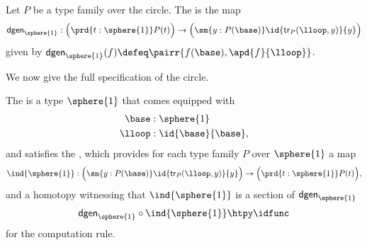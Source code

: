 \begin{defn}
Let $P$ be a type family over the circle. The  is the map
\begin{equation}\label{eq:dgen_circle}
\mathsf{dgen}_{\sphere{1}}:\Big(\prd{t:\sphere{1}}P(t)\Big)\to\Big(\sm{y:P(\base)}\id{\mathsf{tr}_P(\lloop,y)}{y}\Big)
\end{equation}
given by $\mathsf{dgen}_{\sphere{1}}(f)\defeq\pairr{f(\base),\apd{f}{\lloop}}$.
\end{defn}

We now give the full specification of the circle.

\begin{defn}
The  is a type $\sphere{1}$ that comes equipped with
\begin{align*}
\base & : \sphere{1} \\
\lloop & : \id{\base}{\base},
\end{align*}
and satisfies the , which provides for each type family $P$ over $\sphere{1}$ a map
\begin{equation*}
\ind{\sphere{1}}:\Big(\sm{y:P(\base)}\id{\mathsf{tr}_P(\lloop,y)}{y}\Big)\to \Big(\prd{t:\sphere{1}}P(t)\Big),
\end{equation*}
and a homotopy witnessing that $\ind{\sphere{1}}$ is a section of $\mathsf{dgen}_{\sphere{1}}$
\begin{equation*}
\mathsf{dgen}_{\sphere{1}}\circ \ind{\sphere{1}}\htpy \idfunc
\end{equation*}
for the computation rule.
\end{defn}

